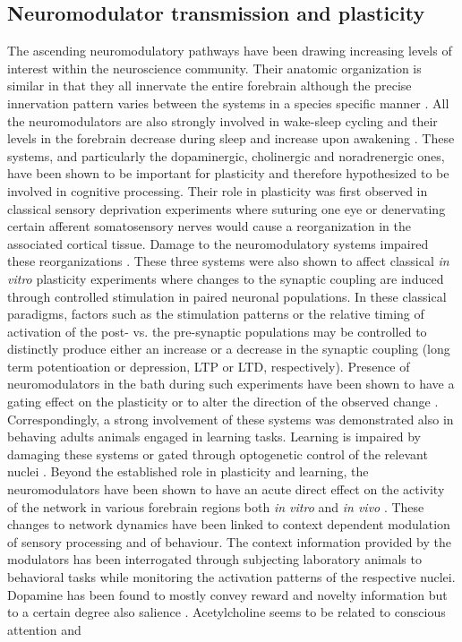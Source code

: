     \subsection{Neuromodulator transmission and plasticity}
    The ascending neuromodulatory pathways have been drawing increasing levels of interest within the neuroscience community. Their anatomic organization is similar in that they all innervate the entire forebrain although the precise innervation pattern varies between the systems in a species specific manner \cite{gu2002neuromodulatory}. All the neuromodulators are also strongly involved in wake-sleep cycling and their levels in the forebrain decrease during sleep and increase upon awakening \cite{saper2005hypothalamic}. These systems, and particularly the dopaminergic, cholinergic and noradrenergic ones, have been shown to be important for plasticity and therefore hypothesized to be involved in cognitive processing. Their role in plasticity was first observed in classical sensory deprivation experiments where suturing one eye or denervating certain afferent somatosensory nerves would cause a reorganization in the associated cortical tissue. Damage to the neuromodulatory systems impaired these reorganizations \cite{gu2002neuromodulatory}. These three systems were also shown to affect classical \textit{in vitro} plasticity experiments where changes to the synaptic coupling are induced through controlled stimulation in paired neuronal populations. In these classical paradigms, factors such as the stimulation patterns or the relative timing of activation of the post- vs. the pre-synaptic populations may be controlled to distinctly produce either an increase or a decrease in the synaptic coupling (long term potentioation or depression, LTP or LTD, respectively). Presence of neuromodulators in the bath during such experiments have been shown to have a gating effect on the plasticity or to alter the direction of the observed change \cite{zhang2009gain,yagishita2014critical,huang2012pull,otani2015dopaminergic,isaac2009hippocampal}. Correspondingly, a strong involvement of these systems was demonstrated also in behaving adults animals engaged in learning tasks. Learning is impaired by damaging these systems or gated through optogenetic control of the relevant nuclei \cite{tsai2009phasic,ogren1980evidence,hasselmo2006role}. Beyond the established role in plasticity and learning, the neuromodulators have been shown to have an acute direct effect on the activity of the network in various forebrain regions both \textit{in vitro} \cite{eytan2004dopamine,kaufman2012long,otani1998dopamine,gu2002neuromodulatory} and \textit{in vivo} \cite{tye2013dopamine,carter2010tuning,kuchibhotla2017parallel}. These changes to network dynamics have been linked to context dependent modulation of sensory processing and of behaviour. The context information provided by the modulators has been interrogated through subjecting laboratory animals to behavioral tasks while monitoring the activation patterns of the respective nuclei. Dopamine has been found to mostly convey reward and novelty information but to a certain degree also salience \cite{schultz2013updating,bromberg2010dopamine}. Acetylcholine seems to be related to conscious attention and 